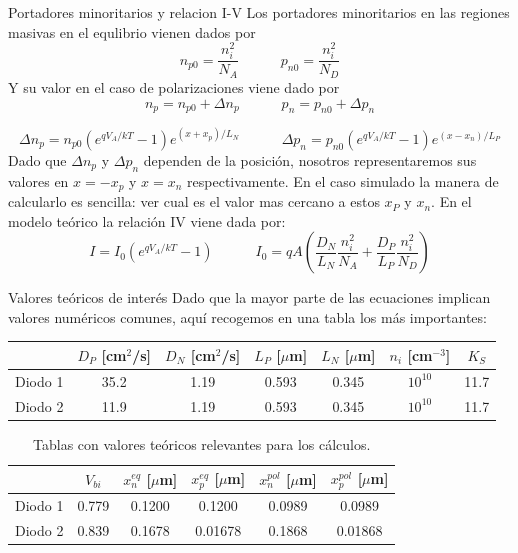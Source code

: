 \documentclass[aspectratio=169,xcolor=dvipsnames]{beamer}
\newcommand{\parentesis}[1]{\left( #1  \right)}
\newcommand{\tquad}{\quad \quad \quad}
\begin{document}
\begin{frame}{Portadores minoritarios y relacion I-V}
    Los portadores minoritarios en las regiones masivas en el equlibrio vienen dados por
    \begin{equation*}
        n_{p0} = \frac{n_i^2}{N_A} \tquad p_{n0} = \frac{n_i^2}{N_D}
    \end{equation*}
    Y su valor en el caso de polarizaciones viene dado por 
    \begin{equation*}
        n_p = n_{p0} + \Delta n_p \tquad p_n = p_{n0} + \Delta p_n
    \end{equation*}

    \begin{equation*}
        \Delta n_p = n_{p0} \parentesis{e^{qV_A/kT}-1} e^{(x+x_p)/L_N} \tquad 
        \Delta p_n = p_{n0} \parentesis{e^{qV_A/kT}-1} e^{(x-x_n)/L_P}
    \end{equation*}
    Dado que $\Delta n_p$ y $\Delta p_n$ dependen de la posición, nosotros representaremos sus valores en $x=-x_p$ y $x=x_n$ respectivamente. En el caso simulado la manera de calcularlo es sencilla: ver cual es el valor mas cercano a estos $x_P$ y $x_n$.     En el modelo teórico la relación IV viene dada por: 
    \begin{equation}
      I = I_0 \parentesis{e^{qV_A/kT}-1} \tquad
     I_0 = qA \parentesis{\frac{D_N}{L_N} \frac{n_i^2}{N_A} + \frac{D_P}{L_P} \frac{n_i^2}{N_D}}
    \end{equation}
\end{frame}

\begin{frame}{Valores teóricos de interés}
    Dado que la mayor parte de las ecuaciones implican valores numéricos comunes, aquí recogemos en una tabla los más importantes: 
    \begin{table}
        \begin{tabular}{c|cccccc}
            & $D_P$ \tiny{[cm$^2$/s]} & $D_N$ \tiny{[cm$^2$/s]} & $L_P$ \tiny{[$\mu$m]} & $L_N$ \tiny{[$\mu$m]} & $n_i$ \tiny{[cm$^{-3}$]} & $K_S$ \\ \hline
            Diodo 1 & 35.2  & 1.19 & 0.593 & 0.345 & $10^{10}$ & 11.7 \\
            Diodo 2 & 11.9  & 1.19 & 0.593 & 0.345 & $10^{10}$ & 11.7 
        \end{tabular}
    \end{table}    
    \begin{table}
        \begin{tabular}{c|ccccc}
            & $V_{bi}$  & $x_n^{eq}$ \tiny{[$\mu$m]}  & $x_p^{eq}$ \tiny{[$\mu$m]}  & $x_n^{pol}$ \tiny{[$\mu$m]} & $x_p^{pol}$ \tiny{[$\mu$m]} \\ \hline
            Diodo 1 & 0.779 & 0.1200 & 0.1200 & 0.0989 & 0.0989  \\
            Diodo 2 & 0.839 & 0.1678 & 0.01678 & 0.1868 &  0.01868
        \end{tabular}
        \caption{Tablas con valores teóricos relevantes para los cálculos.}
    \end{table}   
    
    
    
\end{frame}
\end{document}
